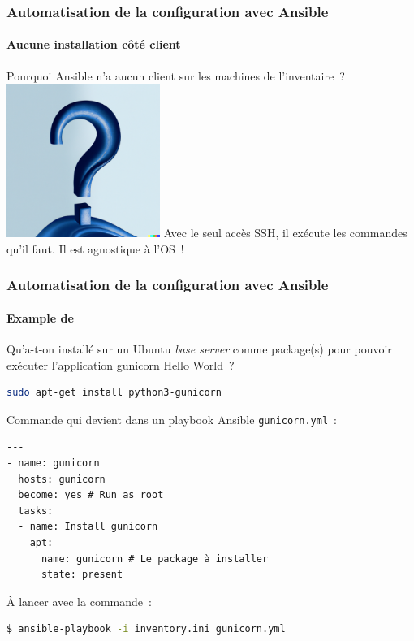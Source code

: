 \documentclass{beamer}
\begin{document}
    \begin{frame}
        \transdissolve
        \frametitle{Automatisation de la configuration avec Ansible}
        \framesubtitle{Aucune installation côté client}
        Pourquoi Ansible n'a aucun client sur les machines de l'inventaire~?
        \bigbreak
        \centering
        \includegraphics[width=5cm]{image/question-mark-on-a-blank-background.png}
        \bigbreak
        \pause
        \flushleft
        Avec le seul accès SSH, il exécute les commandes qu'il faut.
        Il est agnostique à l'OS~!
    \end{frame}

    \begin{frame}[fragile]
        \transdissolve
        \frametitle{Automatisation de la configuration avec Ansible}
        \framesubtitle{Example de }
        Qu'a-t-on installé sur un Ubuntu \textit{base server} comme package(s) pour pouvoir exécuter l'application gunicorn Hello World~?
        \pause
        \begin{lstlisting}[language=bash]
sudo apt-get install python3-gunicorn
        \end{lstlisting}
        Commande qui devient dans un playbook Ansible \lstinline{gunicorn.yml}~:
        \begin{lstlisting}
---
- name: gunicorn
  hosts: gunicorn
  become: yes # Run as root
  tasks:
  - name: Install gunicorn
    apt:
      name: gunicorn # Le package à installer
      state: present
        \end{lstlisting}
        À lancer avec la commande~:
        \begin{lstlisting}[language=bash]
$ ansible-playbook -i inventory.ini gunicorn.yml
        \end{lstlisting}
    \end{frame}
\end{document}
